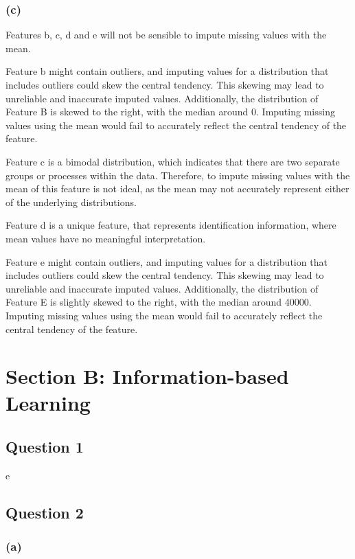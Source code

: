 \documentclass[10pt]{article}
\begin{document}
\subsubsection*{(c)}

Features b, c, d and e will not be sensible to impute missing values with the mean.

Feature b might contain outliers, and imputing values for a distribution that includes outliers
could skew the central tendency. This skewing may lead to unreliable and inaccurate imputed values.
Additionally, the distribution of Feature B is skewed to the right, with the median around 0.
Imputing missing values using the mean would fail to accurately reflect the central tendency of the
feature.

Feature c is a bimodal distribution, which indicates that there are two separate groups or processes
within the data. Therefore, to impute missing values with the mean of this feature is not ideal, as the
mean may not accurately represent either of the underlying distributions.

Feature d is a unique feature, that represents identification information, where mean values have no meaningful
interpretation.

Feature e might contain outliers, and imputing values for a distribution that includes outliers
could skew the central tendency. This skewing may lead to unreliable and inaccurate imputed values.
Additionally, the distribution of Feature E is slightly skewed to the right, with the median around 40000.
Imputing missing values using the mean would fail to accurately reflect the central tendency of the
feature.

\section*{Section B: Information-based Learning}

\subsection*{Question 1}

e

\subsection*{Question 2}

\subsubsection*{(a)}
\end{document}
